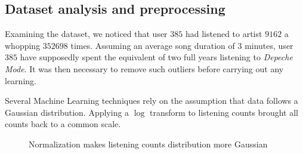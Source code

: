 \documentclass{article}
\begin{document}
  \subsection{Dataset analysis and preprocessing}
  Examining the dataset, we noticed that user $385$ had listened to artist $9162$ a whopping $352698$ times. Assuming an average song duration of $3$ minutes, user $385$ have supposedly spent the equivalent of two full years listening to \textit{Depeche Mode}. It was then necessary to remove such outliers before carrying out any learning.

  Several Machine Learning techniques rely on the assumption that data follows a Gaussian distribution. Applying a $\log$ transform to listening counts brought all counts back to a common scale.

  \begin{figure}[ht]
    \center
    \caption{Normalization makes listening counts distribution more Gaussian}
    \label{fig:recommendation-normalization}
  \end{figure}
\end{document}
